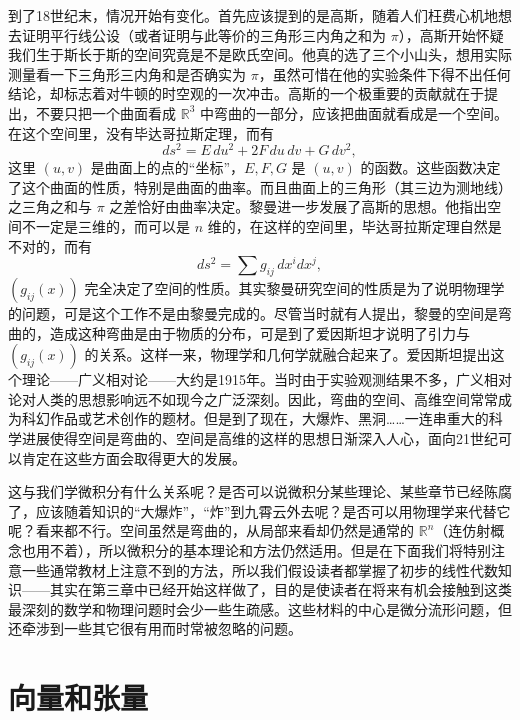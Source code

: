 到了18世纪末，情况开始有变化。首先应该提到的是高斯，随着人们枉费心机地想去证明平行线公设（或者证明与此等价的三角形三内角之和为 $\pi$），高斯开始怀疑我们生于斯长于斯的空间究竟是不是欧氏空间。他真的选了三个小山头，想用实际测量看一下三角形三内角和是否确实为 $\pi$，虽然可惜在他的实验条件下得不出任何结论，却标志着对牛顿的时空观的一次冲击。高斯的一个极重要的贡献就在于提出，不要只把一个曲面看成 $\mathbb R^3$ 中弯曲的一部分，应该把曲面就看成是一个空间。在这个空间里，没有毕达哥拉斯定理，而有
\[
 ds^2=E\,du^2+2F\,du\,dv+G\,dv^2,
\]
这里 $(u,v)$ 是曲面上的点的“坐标”，$E,F,G$ 是 $(u,v)$ 的函数。这些函数决定了这个曲面的性质，特别是曲面的曲率。而且曲面上的三角形（其三边为测地线）之三角之和与 $\pi$ 之差恰好由曲率决定。黎曼进一步发展了高斯的思想。他指出空间不一定是三维的，而可以是 $n$ 维的，在这样的空间里，毕达哥拉斯定理自然是不对的，而有
\[
 ds^2=\sum g_{ij}\,dx^i dx^j,
\]
$(g_{ij}(x))$ 完全决定了空间的性质。其实黎曼研究空间的性质是为了说明物理学的问题，可是这个工作不是由黎曼完成的。尽管当时就有人提出，黎曼的空间是弯曲的，造成这种弯曲是由于物质的分布，可是到了爱因斯坦才说明了引力与 $(g_{ij}(x))$ 的关系。这样一来，物理学和几何学就融合起来了。爱因斯坦提出这个理论——广义相对论——大约是1915年。当时由于实验观测结果不多，广义相对论对人类的思想影响远不如现今之广泛深刻。因此，弯曲的空间、高维空间常常成为科幻作品或艺术创作的题材。但是到了现在，大爆炸、黑洞……一连串重大的科学进展使得空间是弯曲的、空间是高维的这样的思想日渐深入人心，面向21世纪可以肯定在这些方面会取得更大的发展。

这与我们学微积分有什么关系呢？是否可以说微积分某些理论、某些章节已经陈腐了，应该随着知识的“大爆炸”，“炸”到九霄云外去呢？是否可以用物理学来代替它呢？看来都不行。空间虽然是弯曲的，从局部来看却仍然是通常的 $\mathbb R^n$（连仿射概念也用不着），所以微积分的基本理论和方法仍然适用。但是在下面我们将特别注意一些通常教材上注意不到的方法，所以我们假设读者都掌握了初步的线性代数知识——其实在第三章中已经开始这样做了，目的是使读者在将来有机会接触到这类最深刻的数学和物理问题时会少一些生疏感。这些材料的中心是微分流形问题，但还牵涉到一些其它很有用而时常被忽略的问题。

\section{向量和张量}

